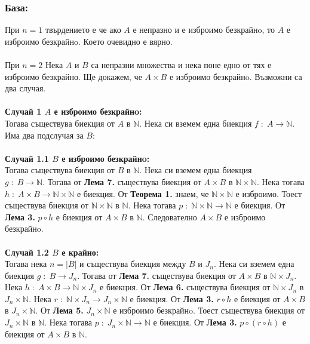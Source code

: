 \documentclass[a4paper, 12pt, oneside]{article}
\newcommand{\N}{\mathbb{N}}
\begin{document}
\subsubsection*{База:}
При \(n = 1\) твърдението е че ако \(A\) е непразно и е изброимо безкрайнo, то \(A\) е изброимо безкрайнo.
Което очевидно е вярно. \\
\hfill \\
\medskip
При \(n = 2\) Нека \(A\) и \(B\) са непразни множества и нека поне едно от тях е изброимо безкрайно.
Ще докажем, че \(A \times B\) е изброимо безкрайнo.
Възможни са два случая. \\
\hfill \\
\medskip
\textbf{Случай 1 \(A\) е изброимо безкрайнo:} \\
Тогава съществува биекция от \(A\) в \(\N\).
Нека си вземем една биекция \(f \; : \; A \to \N\).
Има два подслучая за \(B\): \\
\hfill \\
\medskip
\textbf{Случай 1.1 \(B\) е изброимо безкрайнo:} \\
Тогава съществува биекция от \(B\) в \(\N\).
Нека си вземем една биекция \\
\(g \; : \; B \to \N\). Тогава от \textbf{Лема 7.}
съществува биекция от \(A \times B\) в \(\N \times \N\).
Нека тогава \(h \; : \; A \times B \to \N \times \N\) е биекция.
От \textbf{Теорема 1.} знаем, че \(\N \times \N\) е изброимо.
Тоест съществува биекция от \(\N \times \N\) в \(\N\).
Нека тогава \(p \; : \; \N \times \N \to \N\) е биекция.
От \textbf{Лема 3.} \(p \circ h\) е биекция от \(A \times B\) в \(\N\).
Следователно \(A \times B\) е изброимо безкрайнo. \\
\hfill \\
\medskip
\textbf{Случай 1.2 \(B\) е крайно:} \\
Тогава нека \(n = |B|\) и съществува биекция между \(B\) и \(J_n\).
Нека си вземем една биекция \(g \; : \; B \to J_n\).
Тогава от \textbf{Лема 7.} съществува биекция от \(A \times B\) в \(\N \times J_n\).
Нека \(h \; : \; A \times B \to \N \times J_n\) е биекция.
От \textbf{Лема 6.} съществува биекция от \(\N \times J_n\) в \(J_n \times \N\).
Нека \(r \; : \; \N \times J_n \to J_n \times \N\) е биекция.
От \textbf{Лема 3.} \(r \circ h\) е биекция от \(A \times B\) в \(J_n \times \N\).
От \textbf{Лема 5.} \(J_n \times \N\) е изброимо безкрайнo.
Тоест съществува биекция от \(J_n\times \N\) в \(\N\).
Нека тогава \(p \; : \; J_n \times \N \to \N\) е биекция.
От \textbf{Лема 3.} \(p \circ (r \circ h)\) е биекция от \(A \times B\) в \(\N\).
\end{document}
